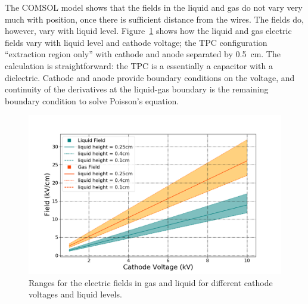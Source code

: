 The COMSOL model shows that the fields in the liquid and gas do not vary very much with position, once there is sufficient distance from the wires. The fields do, however, vary with liquid level. Figure~\ref{fig:fields_in_liquid_and_gas} shows how the liquid and gas electric fields vary with liquid level and cathode voltage; the \ac{TPC} configuration ``extraction region only'' with cathode and anode separated by 0.5~cm. The calculation is straightforward: the \ac{TPC} is a essentially a capacitor with a dielectric. Cathode and anode provide boundary conditions on the voltage, and continuity of the derivatives at the liquid-gas boundary is the remaining boundary condition to solve Poisson's equation.


\begin{figure}[htbp]
\begin{center}
\includegraphics[width=\textwidth]{figures/testbed/fields_in_xaber.png}
\caption{Ranges for the electric fields in gas and liquid for different cathode voltages and liquid levels.}
\label{fig:fields_in_liquid_and_gas}
\end{center}
\end{figure}


